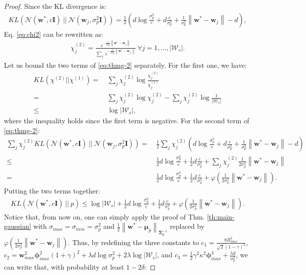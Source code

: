 \documentclass{article}
\newcommand{\norm}[1]{\left\lVert #1 \right\rVert}
\newcommand{\abs}[1]{\left\lvert #1 \right\rvert}
\begin{document}
\begin{proof}
Since the KL divergence is:
\begin{align*}
KL(\mathcal{N}(\bm{w}^*,c\bm{I})\ ||\ \mathcal{N}(\bm{w}_j, \sigma_p^2\bm{I})) = \frac{1}{2}\left( d\log\frac{\sigma^2_p}{c} + d\frac{c}{\sigma^2_p} + \frac{1}{\sigma^2_p}\norm{\bm{w}^* - \bm{w}_j} - d\right),
\end{align*}
Eq. \eqref{eq:chi2} can be rewritten as:
\begin{align*}
\chi^{(2)}_j = \frac{e^{-\frac{1}{2\sigma^2_p}\norm{\bm{w}^* - \bm{w}_j}}}{\sum_{j'}e^{-\frac{1}{2\sigma^2_p}\norm{\bm{w}^* - \bm{w}_{j'}}}}\ \forall j = 1,\dots,\abs{\mathcal{W}_s}.
\end{align*}
Let us bound the two terms of \eqref{eq:thmg-2} separately. For the first one, we have:
\begin{align*}
KL(\chi^{(2)}||\chi^{(1)}) =\ & \sum_j \chi^{(2)}_j \log\frac{\chi^{(2)}_j}{\chi^{(1)}_j}\\ =\ & \sum_j \chi^{(2)}_j \log\chi^{(2)}_j - \sum_j \chi^{(2)}_j \log\frac{1}{\abs{\mathcal{W}_s}}\\ \leq\ & \log\abs{\mathcal{W}_s},
\end{align*}
where the inequality holds since the first term is negative. For the second term of \eqref{eq:thmg-2}:
\begin{align*}
\sum_{j} \chi^{(2)}_{j}KL(\mathcal{N}(\bm{w}^*,c\bm{I})\ ||\ \mathcal{N}(\bm{w}_j, \sigma_p^2\bm{I})) =\ & \frac{1}{2}\sum_{j} \chi^{(2)}_{j}\left( d\log\frac{\sigma^2_p}{c} + d\frac{c}{\sigma^2_p} + \frac{1}{\sigma^2_p}\norm{\bm{w}^* - \bm{w}_j} - d\right)\\ \leq\ & \frac{1}{2}d\log\frac{\sigma^2_p}{c} + \frac{1}{2}d\frac{c}{\sigma^2_p} + \sum_{j} \chi^{(2)}_{j}\frac{1}{2\sigma^2_p}\norm{\bm{w}^* - \bm{w}_j}\\ =\ & \frac{1}{2}d\log\frac{\sigma^2_p}{c} + \frac{1}{2}d\frac{c}{\sigma^2_p} + \varphi\left(\frac{1}{2\sigma^2_p}\norm{\bm{w}^* - \bm{w}_j}\right).
\end{align*}
Putting the two terms together:
\begin{align*}
KL(\mathcal{N}(\bm{w}^*,c\bm{I})\ ||\ p) \leq \log\abs{\mathcal{W}_s} + \frac{1}{2}d\log\frac{\sigma^2_p}{c} + \frac{1}{2}d\frac{c}{\sigma^2_p} + \varphi\left(\frac{1}{2\sigma^2_p}\norm{\bm{w}^* - \bm{w}_j}\right).
\end{align*}
Notice that, from now on, one can simply apply the proof of Thm. \ref{th:main-gaussian} with $\sigma_{max}=\sigma_{min}=\sigma^2_p$ and $\frac{1}{2}\norm{\bm{w}^* - \bm{\mu}_p}_{\bm{\Sigma}_p^{-1}}$ replaced by $\varphi\left(\frac{1}{2\sigma^2_p}\norm{\bm{w}^* - \bm{w}_j}\right)$. Thus, by redefining the three constants to $c_1 = \frac{8R_{max}^2}{\sqrt{2}(1-\gamma)^2}$, $c_2 = \bm{w}_{max}^2\bm{\phi}_{max}^2(1 + \gamma)^2 + \lambda d \log\sigma^2_p + 2\lambda\log\abs{\mathcal{W}_s}$, and $c_3 = \frac{1}{2}\gamma^2\kappa^2\bm{\phi}_{max}^4 + \frac{\lambda d}{\sigma^2_p}$, we can write that, with probability at least $1-2\delta$:

\end{proof}
\end{document}
